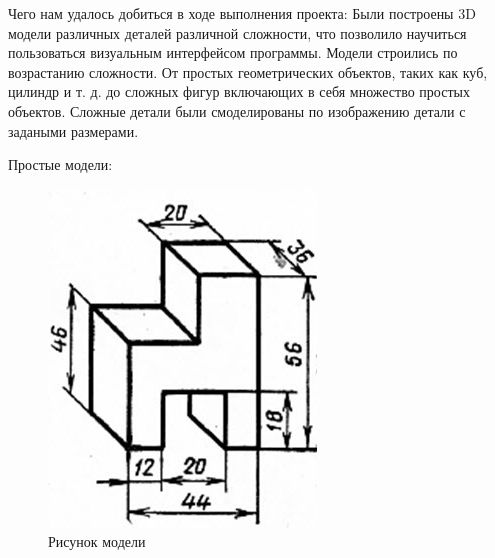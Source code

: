 \documentclass[a4paper,12pt]{article}
\theoremstyle{plain} %
\theoremstyle{definition} %
\theoremstyle{remark} %
\begin{document}
	Чего нам удалось добиться в ходе выполнения проекта:
	Были построены 3D модели различных деталей различной сложности, что позволило научиться пользоваться визуальным интерфейсом программы. Модели строились по возрастанию сложности. От простых геометрических объектов, таких как куб, цилиндр и т. д. до сложных фигур включающих в себя множество простых объектов. Сложные детали были смоделированы по изображению детали с задаными размерами. 

Простые модели:

	\begin{figure}[h]
		\begin{center}
			\begin{minipage}[h]{0.4\linewidth}
				\includegraphics[width=1\linewidth]{17.1}
				\caption{Рисунок модели} %
			\end{minipage}
			\hfill
			\begin{minipage}[h]{0.4\linewidth}

\end{minipage}
\end{center}
\end{figure}
\end{document}
